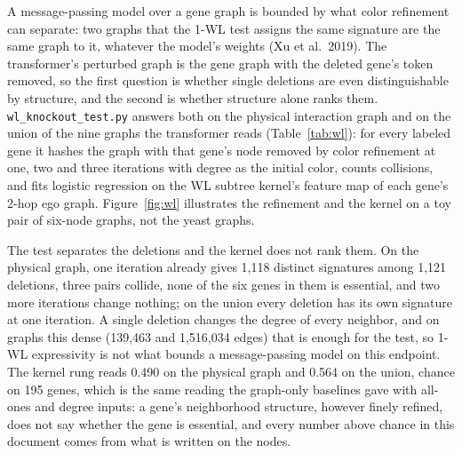 A message-passing model over a gene graph is bounded by what color refinement can
separate: two graphs that the 1-WL test assigns the same signature are the same graph to
it, whatever the model's weights (Xu et al.\ 2019). The transformer's perturbed graph is
the gene graph with the deleted gene's token removed, so the first question is whether
single deletions are even distinguishable by structure, and the second is whether
structure alone ranks them. \texttt{wl\_knockout\_test.py} answers both on the physical
interaction graph and on the union of the nine graphs the transformer reads
(Table~\ref{tab:wl}): for every labeled gene it hashes the graph with that gene's node
removed by color refinement at one, two and three iterations with degree as the initial
color, counts collisions, and fits logistic regression on the WL subtree kernel's
feature map of each gene's 2-hop ego graph. Figure~\ref{fig:wl} illustrates the
refinement and the kernel on a toy pair of six-node graphs, not the yeast graphs.



The test separates the deletions and the kernel does not rank them. On the physical
graph, one iteration already gives 1,118 distinct signatures among 1,121 deletions, three
pairs collide, none of the six genes in them is essential, and two more iterations change
nothing; on the union every deletion has its own signature at one iteration. A single
deletion changes the degree of every neighbor, and on graphs this dense (139,463 and
1,516,034 edges) that is enough for the test, so 1-WL expressivity is not what bounds a
message-passing model on this endpoint. The kernel rung reads 0.490 on the physical
graph and 0.564 on the union, chance on 195 genes, which is the same reading the
graph-only baselines gave with all-ones and degree inputs: a gene's neighborhood
structure, however finely refined, does not say whether the gene is essential, and every
number above chance in this document comes from what is written on the nodes.

